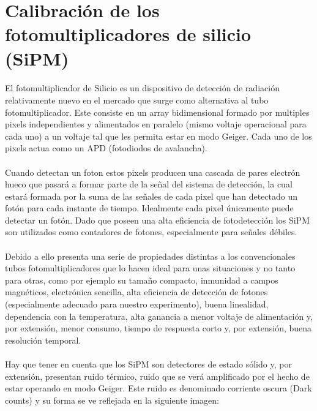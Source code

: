 \documentclass[11pt, a4paper]{article}
\begin{document}
\newpage

\section {Calibración de los fotomultiplicadores de silicio (SiPM)}
\paragraph {}
El fotomultiplicador de Silicio es un dispositivo de detección de radiación relativamente nuevo en el mercado que surge como alternativa al tubo fotomultiplicador. Este consiste en un array bidimensional formado por multiples pixels independientes y alimentados en paralelo (mismo voltaje operacional para cada uno) a un voltaje tal que les permita estar en modo Geiger. Cada uno de los pixels actua como un APD (fotodiodos de avalancha).

\paragraph {}
Cuando detectan un foton estos pixels producen una cascada de pares electrón hueco que pasará a formar parte de la señal del sistema de detección, la cual estará formada por la suma de las señales de cada pixel que han detectado un fotón para cada instante de tiempo. Idealmente cada pixel únicamente puede detectar un fotón. Dado que poseen una alta eficiencia de fotodetección los SiPM son utilizados como contadores de fotones, especialmente para señales débiles.

\paragraph {}
Debido a ello presenta una serie de propiedades distintas a los convencionales tubos fotomultiplicadores que lo hacen ideal para unas situaciones y no tanto para otras, como por ejemplo su tamaño compacto, inmunidad a campos magnéticos, electrónica sencilla, alta eficiencia de detección de fotones (especialmente adecuado para nuestro experimento), buena linealidad, dependencia con la temperatura, alta ganancia a menor voltaje de alimentación y, por extensión, menor consumo, tiempo de respuesta corto y, por extensión, buena resolución temporal.

\paragraph {}
Hay que tener en cuenta que los SiPM son detectores de estado sólido y, por extensión, presentan ruido térmico, ruido que se verá amplificado por el hecho de estar operando en modo Geiger. Este ruido es denominado corriente oscura (Dark counts) y su forma se ve reflejada en la siguiente imagen:
\end{document}
